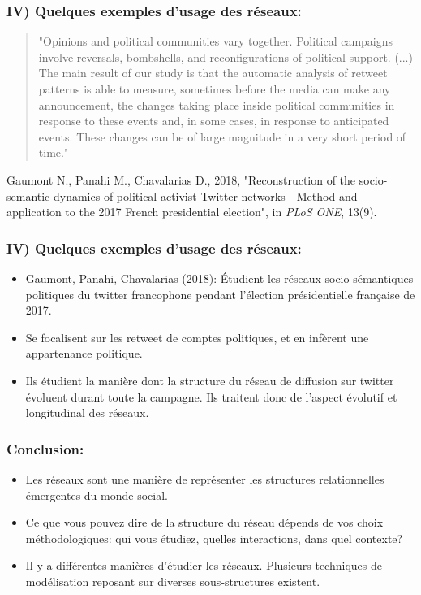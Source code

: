 \documentclass{beamer}
\begin{document}
\begin{frame}
    \frametitle{IV) Quelques exemples d'usage des réseaux:}
    \begin{quotation}
        "Opinions and political communities vary together. Political campaigns involve reversals, bombshells, and reconfigurations of political support. (...) The main result of our study is that the automatic analysis of retweet patterns is able to measure, sometimes before the media can make any announcement, the changes taking place inside political communities in response to these events and, in some cases, in response to anticipated events. These changes can be of large magnitude in a very short period of time."
    \end{quotation}
    \begin{center}
        \small{Gaumont N., Panahi M., Chavalarias D., 2018, "Reconstruction of the socio-semantic dynamics of political activist Twitter networks—Method and application to the 2017 French presidential election", in \emph{PLoS ONE}, 13(9).}
    \end{center}
\end{frame}

\begin{frame}
    \frametitle{IV) Quelques exemples d'usage des réseaux:}
    \begin{itemize}
        \item Gaumont, Panahi, Chavalarias (2018): Étudient les réseaux socio-sémantiques politiques du twitter francophone pendant l'élection présidentielle française de 2017.
        \item Se focalisent sur les retweet de comptes politiques, et en infèrent une appartenance politique.
        \item Ils étudient la manière dont la structure du réseau de diffusion sur twitter évoluent durant toute la campagne. Ils traitent donc de l'aspect évolutif et longitudinal des réseaux.
    \end{itemize}
\end{frame}

\begin{frame}
    \frametitle{Conclusion:}
    \begin{itemize}
        \item Les réseaux sont une manière de représenter les structures relationnelles émergentes du monde social.
        \item Ce que vous pouvez dire de la structure du réseau dépends de vos choix méthodologiques: qui vous étudiez, quelles interactions, dans quel contexte?
        \item Il y a différentes manières d'étudier les réseaux. Plusieurs techniques de modélisation reposant sur diverses sous-structures existent.
    \end{itemize}
\end{frame}
\end{document}
